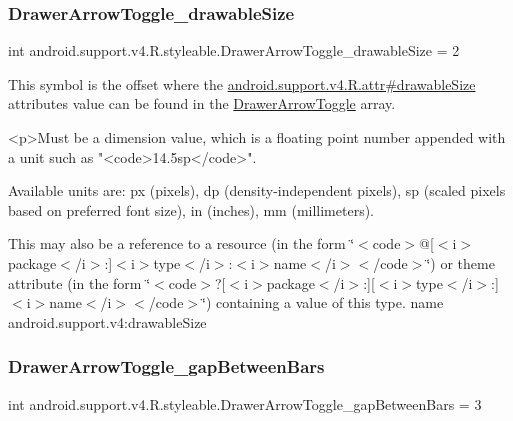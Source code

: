 \subsubsection{\texorpdfstring{Drawer\+Arrow\+Toggle\+\_\+drawable\+Size}{DrawerArrowToggle\_drawableSize}}
{\footnotesize\ttfamily int android.\+support.\+v4.\+R.\+styleable.\+Drawer\+Arrow\+Toggle\+\_\+drawable\+Size = 2\hspace{0.3cm}{\ttfamily [static]}}

This symbol is the offset where the \hyperlink{classandroid_1_1support_1_1v4_1_1R_1_1attr_a158e95bf8e6d89159dc97c65f16f1957}{android.\+support.\+v4.\+R.\+attr\#drawable\+Size} attribute\textquotesingle{}s value can be found in the \hyperlink{classandroid_1_1support_1_1v4_1_1R_1_1styleable_af08d693b5d7faf0f18822ffe29c6028c}{Drawer\+Arrow\+Toggle} array.

\begin{DoxyVerb}      <p>Must be a dimension value, which is a floating point number appended with a unit such as "<code>14.5sp</code>".
\end{DoxyVerb}
 Available units are\+: px (pixels), dp (density-\/independent pixels), sp (scaled pixels based on preferred font size), in (inches), mm (millimeters). 

This may also be a reference to a resource (in the form \char`\"{}$<$code$>$@\mbox{[}$<$i$>$package$<$/i$>$\+:\mbox{]}$<$i$>$type$<$/i$>$\+:$<$i$>$name$<$/i$>$$<$/code$>$\char`\"{}) or theme attribute (in the form \char`\"{}$<$code$>$?\mbox{[}$<$i$>$package$<$/i$>$\+:\mbox{]}\mbox{[}$<$i$>$type$<$/i$>$\+:\mbox{]}$<$i$>$name$<$/i$>$$<$/code$>$\char`\"{}) containing a value of this type.  name android.\+support.\+v4\+:drawable\+Size \mbox{\label{classandroid_1_1support_1_1v4_1_1R_1_1styleable_ae17bd4d67410b191b674e1359e019598}} 
\subsubsection{\texorpdfstring{Drawer\+Arrow\+Toggle\+\_\+gap\+Between\+Bars}{DrawerArrowToggle\_gapBetweenBars}}
{\footnotesize\ttfamily int android.\+support.\+v4.\+R.\+styleable.\+Drawer\+Arrow\+Toggle\+\_\+gap\+Between\+Bars = 3\hspace{0.3cm}{\ttfamily [static]}}

